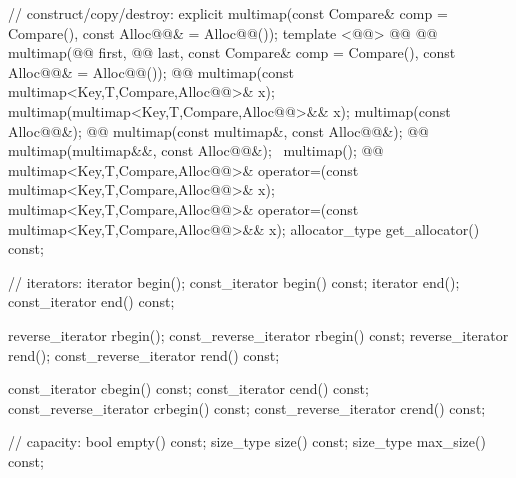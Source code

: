 \documentclass[american,twoside]{book}
\begin{document}
\begin{codeblock}
{{    // construct/copy/destroy:
    explicit multimap(const Compare& comp = Compare(),
                      const Alloc@@& = Alloc@@());
    template <@@>
      @@
            @@
      multimap(@@ first, @@ last,
          const Compare& comp = Compare(), const Alloc@@& = Alloc@@());
    @@ 
      multimap(const multimap<Key,T,Compare,Alloc@@>& x);
    multimap(multimap<Key,T,Compare,Alloc@@>&& x);
    multimap(const Alloc@@&);
    @@ 
      multimap(const multimap&, const Alloc@@&);
    @@
      multimap(multimap&&, const Alloc@@&);
   ~multimap();
    @@
      multimap<Key,T,Compare,Alloc@@>& operator=(const multimap<Key,T,Compare,Alloc@@>& x);
    multimap<Key,T,Compare,Alloc@@>&
      operator=(const multimap<Key,T,Compare,Alloc@@>&& x);
    allocator_type get_allocator() const;

    // iterators:
    iterator               begin();
    const_iterator         begin() const;
    iterator               end();
    const_iterator         end() const;

    reverse_iterator       rbegin();
    const_reverse_iterator rbegin() const;
    reverse_iterator       rend();
    const_reverse_iterator rend() const;

    const_iterator         cbegin() const;
    const_iterator         cend() const;
    const_reverse_iterator crbegin() const;
    const_reverse_iterator crend() const;

    // capacity:
    bool           empty() const;
    size_type      size() const;
    size_type      max_size() const;

}}
\end{codeblock}
\end{document}
